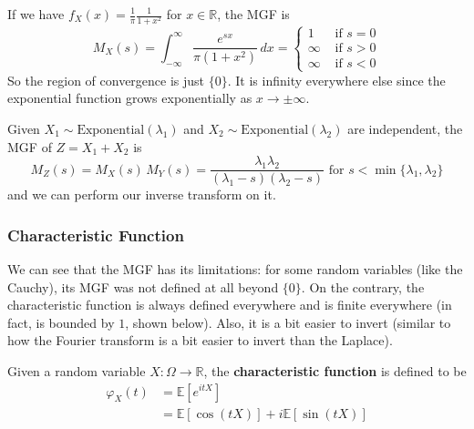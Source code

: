     \begin{example}[Cauchy RV]
      If we have $f_X (x) = \frac{1}{\pi} \frac{1}{1 + x^2}$ for $x \in \mathbb{R}$, the MGF is 
      \begin{equation}
        M_X (s) = \int_{-\infty}^\infty \frac{e^{s x}}{\pi (1 + x^2)} \,dx = \begin{cases} 1 & \text{ if } s = 0 \\
        \infty & \text{ if } s > 0 \\ 
        \infty & \text{ if } s < 0 \end{cases}
      \end{equation}
      So the region of convergence is just $\{0\}$. It is infinity everywhere else since the exponential function grows exponentially as $x \rightarrow \pm \infty$. 
    \end{example}

    \begin{example}
      Given $X_1 \sim \mathrm{Exponential}(\lambda_1)$ and $X_2 \sim \mathrm{Exponential}(\lambda_2)$ are independent, the MGF of $Z = X_1 + X_2$ is 
      \begin{equation}
        M_Z (s) = M_X (s) \, M_Y (s) = \frac{\lambda_1 \lambda_2}{(\lambda_1 - s)(\lambda_2 - s)} \text{ for } s < \min\{\lambda_1, \lambda_2\}
      \end{equation}
      and we can perform our inverse transform on it. 
    \end{example}

  \subsubsection{Characteristic Function}

    We can see that the MGF has its limitations: for some random variables (like the Cauchy), its MGF was not defined at all beyond $\{0\}$. On the contrary, the characteristic function is always defined everywhere and is finite everywhere (in fact, is bounded by $1$, shown below). Also, it is a bit easier to invert (similar to how the Fourier transform is a bit easier to invert than the Laplace). 

    \begin{definition}
      Given a random variable $X: \Omega \longrightarrow \mathbb{R}$, the \textbf{characteristic function} is defined to be 
      \begin{align*}
        \varphi_X (t) & = \mathbb{E}[ e^{i t X} ] \\
        & = \mathbb{E}[\cos{(t X)}] + i \mathbb{E}[ \sin{(t X)}]
      \end{align*}
    \end{definition}

